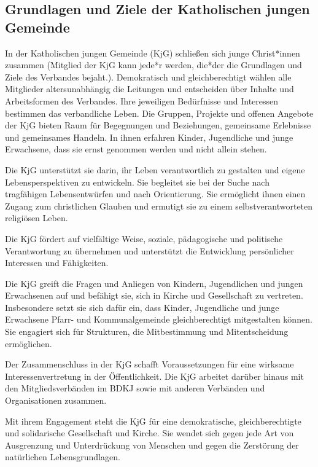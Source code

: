 \documentclass[12pt]{report}
\begin{document}
\begin{justify}
\setlength\parindent{0pt}
\setlength{\parskip}{\baselineskip}

\chapter{Grundlagen und Ziele der Katholischen jungen Gemeinde}
In der Katholischen jungen Gemeinde (KjG) schließen sich junge Christ*innen zusammen
(Mitglied der KjG kann jede*r werden, die*der die Grundlagen und Ziele des Verbandes bejaht.).
Demokratisch und gleichberechtigt wählen alle Mitglieder altersunabhängig die Leitungen und
entscheiden über Inhalte und Arbeitsformen des Verbandes.
Ihre jeweiligen Bedürfnisse und Interessen bestimmen das verbandliche Leben. Die Gruppen,
Projekte und offenen Angebote der KjG bieten Raum für Begegnungen und Beziehungen,
gemeinsame Erlebnisse und gemeinsames Handeln. In ihnen erfahren Kinder, Jugendliche und junge
Erwachsene, dass sie ernst genommen werden und nicht allein stehen.

Die KjG unterstützt sie darin, ihr Leben verantwortlich zu gestalten und eigene Lebensperspektiven zu entwickeln.
Sie begleitet sie bei der Suche nach tragfähigen Lebensentwürfen und nach Orientierung.
Sie ermöglicht ihnen einen Zugang zum christlichen Glauben und ermutigt sie zu einem selbstverantworteten religiösen Leben.

Die KjG fördert auf vielfältige Weise, soziale, pädagogische und politische Verantwortung zu
übernehmen und unterstützt die Entwicklung persönlicher Interessen und Fähigkeiten.

Die KjG greift die Fragen und Anliegen von Kindern, Jugendlichen und jungen Erwachsenen auf
und befähigt sie, sich in Kirche und Gesellschaft zu vertreten. Insbesondere setzt sie sich dafür
ein, dass Kinder, Jugendliche und junge Erwachsene Pfarr- und Kommunalgemeinde gleichberechtigt mitgestalten können.
Sie engagiert sich für Strukturen, die Mitbestimmung und Mitentscheidung ermöglichen.

Der Zusammenschluss in der KjG schafft Voraussetzungen für eine wirksame Interessenvertretung in der Öffentlichkeit.
Die KjG arbeitet darüber hinaus mit den Mitgliedsverbänden im BDKJ
sowie mit anderen Verbänden und Organisationen zusammen.

Mit ihrem Engagement steht die KjG für eine demokratische, gleichberechtigte und solidarische
Gesellschaft und Kirche. Sie wendet sich gegen jede Art von Ausgrenzung und Unterdrückung von
Menschen und gegen die Zerstörung der natürlichen Lebensgrundlagen.


\end{justify}
\end{document}

